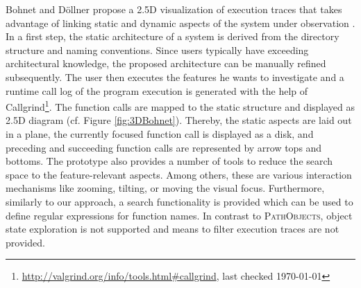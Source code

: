 Bohnet and Döllner propose a 2.5D visualization of execution traces that takes advantage of linking static and dynamic aspects of the system under observation \cite{bohnet_visual_2006}.
In a first step, the static architecture of a system is derived from the directory structure and naming conventions.
Since users typically have exceeding architectural knowledge, the proposed architecture can be manually refined subsequently.
The user then executes the features he wants to investigate and a runtime call log of the program execution is generated with the help of Callgrind\footnote{\url{http://valgrind.org/info/tools.html\#callgrind}, last checked \today}.
The function calls are mapped to the static structure and displayed as 2.5D diagram (cf. Figure \ref{fig:3DBohnet}).
Thereby, the static aspects are laid out in a plane, the currently focused function call is displayed as a disk, and preceding and succeeding function calls are represented by arrow tops and bottoms.
The prototype also provides a number of tools to reduce the search space to the feature-relevant aspects.
Among others, these are various interaction mechanisms like zooming, tilting, or moving the visual focus.
Furthermore, similarly to our approach, a search functionality is provided which can be used to define regular expressions for function names.
In contrast to \textsc{PathObjects}, object state exploration is not supported and means to filter execution traces are not provided.

